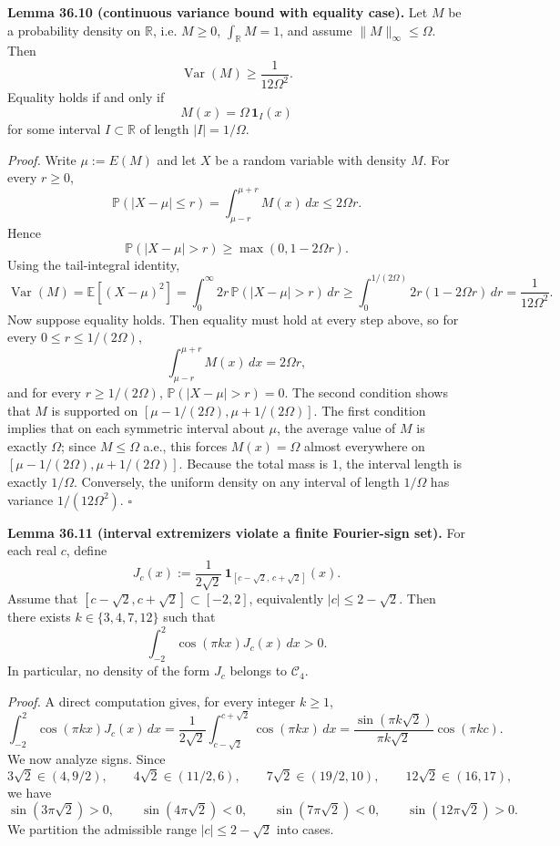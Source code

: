 \medskip
\noindent\textbf{Lemma 36.10 (continuous variance bound with equality case).}
Let \(M\) be a probability density on \(\mathbb R\), i.e.
\(M\ge 0\), \(\int_{\mathbb R}M=1\), and assume \(\|M\|_\infty\le \Omega\).
Then
\[
 \operatorname{Var}(M)\ge \frac{1}{12\Omega^2}.
\]
Equality holds if and only if
\[
 M(x)=\Omega\,\mathbf 1_I(x)
\]
for some interval \(I\subset \mathbb R\) of length \(|I|=1/\Omega\).

\noindent\emph{Proof.}
Write \(\mu:=E(M)\) and let \(X\) be a random variable with density \(M\).
For every \(r\ge 0\),
\[
 \mathbb P(|X-\mu|\le r)=\int_{\mu-r}^{\mu+r}M(x)\,dx\le 2\Omega r.
\]
Hence
\[
 \mathbb P(|X-\mu|>r)\ge \max(0,1-2\Omega r).
\]
Using the tail-integral identity,
\[
 \operatorname{Var}(M)=\mathbb E[(X-\mu)^2]
 =\int_0^{\infty}2r\,\mathbb P(|X-\mu|>r)\,dr
 \ge \int_0^{1/(2\Omega)}2r(1-2\Omega r)\,dr
 =\frac{1}{12\Omega^2}.
\]
Now suppose equality holds.
Then equality must hold at every step above, so for every \(0\le r\le 1/(2\Omega)\),
\[
 \int_{\mu-r}^{\mu+r}M(x)\,dx=2\Omega r,
\]
and for every \(r\ge 1/(2\Omega)\),
\(
 \mathbb P(|X-\mu|>r)=0
\).
The second condition shows that \(M\) is supported on
\([\mu-1/(2\Omega),\mu+1/(2\Omega)]\).
The first condition implies that on each symmetric interval about \(\mu\), the average value of \(M\) is exactly \(\Omega\); since \(M\le \Omega\) a.e., this forces
\(M(x)=\Omega\) almost everywhere on
\([\mu-1/(2\Omega),\mu+1/(2\Omega)]\).
Because the total mass is \(1\), the interval length is exactly \(1/\Omega\).
Conversely, the uniform density on any interval of length \(1/\Omega\) has variance \(1/(12\Omega^2)\).
\hfill$\square$

\medskip
\noindent\textbf{Lemma 36.11 (interval extremizers violate a finite Fourier-sign set).}
For each real \(c\), define
\[
 J_c(x):=\frac{1}{2\sqrt 2}\,\mathbf 1_{[c-\sqrt 2,\,c+\sqrt 2]}(x).
\]
Assume that \([c-\sqrt 2,c+\sqrt 2]\subset[-2,2]\), equivalently
\(
 |c|\le 2-\sqrt 2
\).
Then there exists \(k\in\{3,4,7,12\}\) such that
\[
 \int_{-2}^{2}\cos(\pi kx)J_c(x)\,dx>0.
\]
In particular, no density of the form \(J_c\) belongs to \(\mathcal C_4\).

\noindent\emph{Proof.}
A direct computation gives, for every integer \(k\ge 1\),
\[
 \int_{-2}^{2}\cos(\pi kx)J_c(x)\,dx
 =\frac{1}{2\sqrt 2}\int_{c-\sqrt 2}^{c+\sqrt 2}\cos(\pi kx)\,dx
 =\frac{\sin(\pi k\sqrt 2)}{\pi k\sqrt 2}\cos(\pi kc).
\]
We now analyze signs.
Since
\[
 3\sqrt 2\in(4,9/2),\qquad 4\sqrt 2\in(11/2,6),\qquad 7\sqrt 2\in(19/2,10),\qquad 12\sqrt 2\in(16,17),
\]
we have
\[
 \sin(3\pi\sqrt 2)>0,
 \qquad
 \sin(4\pi\sqrt 2)<0,
 \qquad
 \sin(7\pi\sqrt 2)<0,
 \qquad
 \sin(12\pi\sqrt 2)>0.
\]
We partition the admissible range \(|c|\le 2-\sqrt 2\) into cases.

